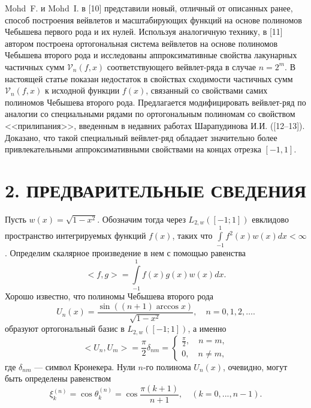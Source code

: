 \documentclass[12pt]{book}
\begin{document}
Mohd~F. и Mohd~I. в [10]
представили новый, отличный от описанных ранее, способ построения вейвлетов и масштабирующих функций на основе полиномов Чебышева первого рода и их нулей. Используя аналогичную технику, в [11]
автором построена ортогональная система вейвлетов на основе полиномов Чебышева второго рода и исследованы аппроксимативные свойства лакунарных частичных сумм $\mathcal{V}_n(f,x)$ соответствующего вейвлет-ряда в случае $n = 2^m$.
В настоящей статье показан недостаток в свойствах сходимости частичных сумм $\mathcal{V}_n(f,x)$ к исходной функции $f(x)$, связанный со свойствами самих полиномов Чебышева второго рода. Предлагается модифицировать вейвлет-ряд по аналогии со специальными рядами по ортогональным полиномам со свойством <<прилипания>>, введенным в недавних работах Шарапудинова И.И.
([12--13]). Доказано, что такой специальный вейвлет-ряд обладает значительно более привлекательными аппроксимативными свойствами на концах отрезка $[-1, 1]$.



\section*{2. ПРЕДВАРИТЕЛЬНЫЕ СВЕДЕНИЯ}

Пусть $w(x) = \sqrt{1-x^2}$. Обозначим тогда через $L_{2, w}([-1; 1])$ евклидово пространство интегрируемых функций $f(x)$, таких что
$\int\limits_{-1}^{1} f^2(x)w(x)dx < \infty$.
Определим скалярное произведение в нем с помощью равенства
\begin{equation}
\label{scal}
<f, g> = \int\limits_{-1}^{1} f(x) g(x) w(x) dx.
\end{equation}
Хорошо известно, что полиномы Чебышева второго рода
 \begin{equation*}
\label{u2direct}
U_n(x) = \frac{\sin((n+1)\arccos{x})}{\sqrt{1-x^2}}, \quad n = 0,1,2, \ldots .
\end{equation*}
образуют ортогональный базис в $L_{2, w}([-1; 1])$, а именно
\begin{equation}
\label{sms1ortho}
<U_n, U_m> = \frac{\pi}{2}\delta_{nm} =
\left\{
\begin{aligned}
\frac{\pi}{2}, \quad n=m,\\
0, \quad  n \neq m,
\end{aligned}
\right.
\end{equation}
где $\delta_{nm}$ --- символ Кронекера.
Нули $n$-го полинома $U_n(x)$, очевидно, могут быть определены равенством
\begin{equation*}
\label{sms1zeros}
\xi_{k}^{(n)} = \cos{\theta_{k}^{(n)}} =  \cos{\frac{\pi (k+1)}{n+1}}, \quad (k = 0,...,n-1).
\end{equation*}
\end{document}
